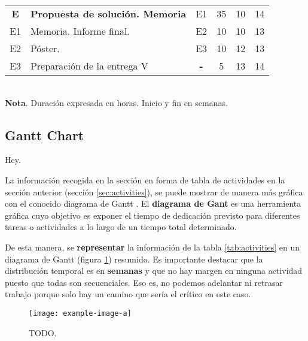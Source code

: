 \begin{table}[p]
\begin{tabular}{clcccc}
    \rowcolor{gray!7.5}
    \textbf{E} & \bf Propuesta de solución. Memoria & E1    & 35 & 10 & 14 \\
    \rowcolor{gray!7.5}
    E1         & Memoria. Informe final.            & E2    & 10 & 10 & 13 \\
    \rowcolor{gray!7.5}
    E2         & Póster.                            & E3    & 10 & 12 & 13 \\
    \rowcolor{gray!7.5}
    E3         & Preparación de la entrega V        & \bf - & 5  & 13 & 14 \\
    \bottomrule
  \end{tabular}                                                            \\[1.25ex]
  \textbf{Nota}. Duración expresada en horas. Inicio y fin en semanas.
\end{table}










\subsection{Gantt Chart}\label{sec:gantt}


Hey.



La información recogida en la sección en forma de tabla de actividades en la
sección anterior (sección \ref{sec:activities}), se puede mostrar de manera más
gráfica con el conocido diagrama de Gantt \cite{gantt}. El \textbf{diagrama de
  Gant} es una herramienta gráfica cuyo objetivo es exponer el tiempo de
dedicación previsto para diferentes tareas o actividades a lo largo de un tiempo
total determinado.

De esta manera, se \textbf{representar} la información de la tabla
\ref{tab:activities} en un diagrama de Gantt (figura \ref{fig:gantt})
resumido. Es importante destacar que la distribución temporal es en
\textbf{semanas} y que no hay margen en ninguna actividad puesto que todas son secuenciales. Eso es, no podemos adelantar ni retrasar trabajo porque solo hay un camino que sería el crítico en este caso.

\begin{figure}[htbp]
    \centering
    \texttt{[image: example-image-a]}
    \caption[TODO]{TODO.}\label{fig:gantt}
\end{figure}

